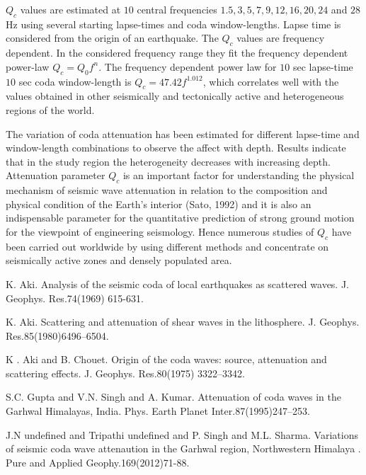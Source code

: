 \documentclass[article, A4, 11pt]{llncs}%
\begin{document}
$Q_{c}$ values are estimated at $10$ central frequencies $1.5, 3, 5, 7, 9, 12, 16, 20, 24$ and $28$ Hz using several starting lapse-times and coda window-lengths. Lapse time is considered from the origin of an earthquake. The $Q_{c}$  values are frequency dependent. In the considered frequency range they fit the frequency dependent power-law $Q_{c} = Q_{0}f^{n}$. The frequency dependent power law for $10$ sec lapse-time $10$ sec coda window-length is $Q_{c} = 47.42f^{1.012}$, which correlates well with the values obtained in other seismically and tectonically active and heterogeneous regions of the world.

The variation of coda attenuation has been estimated for different lapse-time and window-length combinations to observe the affect with depth. Results indicate that in the study region the heterogeneity decreases with increasing depth. Attenuation parameter $Q_{c}$  is an important factor for understanding the physical mechanism of seismic wave attenuation in relation to the composition and physical condition of the Earth's interior (Sato, 1992) and it is also an indispensable parameter  for the quantitative prediction of strong ground motion for the viewpoint of engineering seismology. Hence numerous studies of $Q_{c}$  have been carried out worldwide by using different methods and concentrate on seismically active zones and densely populated area.


\begin{thebibliography}{10}
{\sc K. Aki}. {Analysis of the seismic coda of local earthquakes as scattered waves}. J. Geophys. Res.74(1969) 615-631.

{\sc K. Aki}. {Scattering and attenuation of shear waves in the lithosphere}. J. Geophys. Res.85(1980)6496–6504.

{\sc K . Aki and B. Chouet}. {Origin of the coda waves: source, attenuation and scattering effects}. J. Geophys. Res.80(1975) 3322–3342.

{\sc  S.C. Gupta and V.N. Singh and A. Kumar}. { Attenuation of coda waves in the Garhwal Himalayas, India}. Phys. Earth Planet Inter.87(1995)247–253.

{\sc J.N undefined and Tripathi undefined and P. Singh and M.L. Sharma}. {Variations of seismic coda wave attenaution in the Garhwal region, Northwestern Himalaya }. Pure and Applied Geophy.169(2012)71-88.
\end{thebibliography} %
\end{document}
